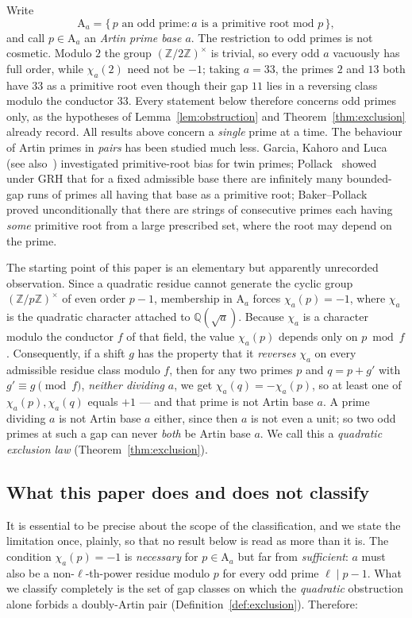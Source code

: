 \documentclass[11pt,reqno]{amsart}
\theoremstyle{plain}
\theoremstyle{definition}
\newcommand{\Art}{\mathrm{A}}
\newcommand{\Z}{\mathbb{Z}}
\newcommand{\Q}{\mathbb{Q}}
\begin{document}
Write
\[
  \Art_a = \{\, p \text{ an odd prime} : a \text{ is a primitive root mod } p \,\},
\]
and call $p \in \Art_a$ an \emph{Artin prime base $a$}. The restriction to odd
primes is not cosmetic. Modulo $2$ the group $(\Z/2\Z)^\times$ is trivial, so
every odd $a$ vacuously has full order, while $\chi_a(2)$ need not be $-1$;
taking $a = 33$, the primes $2$ and $13$ both have $33$ as a primitive root
even though their gap $11$ lies in a reversing class modulo the conductor
$33$. Every statement below therefore concerns odd primes only, as the
hypotheses of Lemma~\ref{lem:obstruction} and Theorem~\ref{thm:exclusion}
already record. All results above
concern a \emph{single} prime at a time. The behaviour of Artin primes in
\emph{pairs} has been studied much less. Garcia, Kahoro and
Luca~\cite{GarciaKahoroLuca2019} (see also~\cite{GarciaLucaShiUdell2020})
investigated primitive-root bias for twin primes; Pollack~\cite{Pollack2014}
showed under GRH that for a fixed admissible base there are infinitely many
bounded-gap runs of primes all having that base as a primitive root;
Baker--Pollack~\cite{BakerPollack2016} proved unconditionally that there are
strings of consecutive primes each having \emph{some} primitive root from a
large prescribed set, where the root may depend on the prime.

The starting point of this paper is an elementary but apparently unrecorded
observation. Since a quadratic residue cannot generate the cyclic group
$(\Z/p\Z)^\times$ of even order $p - 1$, membership in $\Art_a$ forces
$\chi_a(p) = -1$, where $\chi_a$ is the quadratic character attached to
$\Q(\sqrt{a})$. Because $\chi_a$ is a character modulo the conductor $f$ of
that field, the value $\chi_a(p)$ depends only on $p \bmod f$. Consequently, if
a shift $g$ has the property that it \emph{reverses} $\chi_a$ on every
admissible residue class modulo $f$, then for any two primes $p$ and $q = p+g'$
with $g' \equiv g \pmod f$, \emph{neither dividing $a$}, we get
$\chi_a(q) = -\chi_a(p)$, so at least one of $\chi_a(p), \chi_a(q)$ equals
$+1$ --- and that prime is not Artin base $a$. A prime dividing $a$ is not
Artin base $a$ either, since then $a$ is not even a unit; so two odd primes at
such a gap can never \emph{both} be Artin base $a$. We call this
a \emph{quadratic exclusion law} (Theorem~\ref{thm:exclusion}).

\subsection*{What this paper does and does not classify}
It is essential to be precise about the scope of the classification, and we
state the limitation once, plainly, so that no result below is read as more
than it is. The condition $\chi_a(p) = -1$ is \emph{necessary} for $p \in
\Art_a$ but far from \emph{sufficient}: $a$ must also be a non-$\ell$-th-power
residue modulo $p$ for every odd prime $\ell \mid p-1$. What we classify
completely is the set of gap classes on which the \emph{quadratic} obstruction
alone forbids a doubly-Artin pair (Definition~\ref{def:exclusion}). Therefore:
\end{document}
